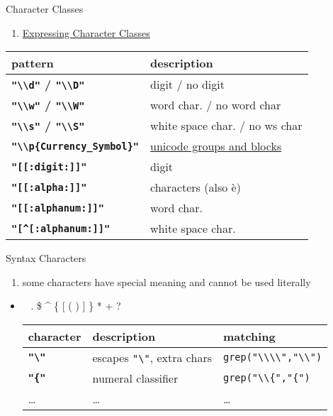 \documentclass[ignorenonframetext,]{beamer}
\providecommand{\tightlist}{%
  \setlength{\itemsep}{0pt}\setlength{\parskip}{0pt}}
\begin{document}
\begin{frame}[fragile]{Character Classes}

\begin{enumerate}
\def\labelenumi{\arabic{enumi})}
\setcounter{enumi}{2}
\tightlist
\item
  \href{http://regexlib.com/CheatSheet.aspx}{Expressing Character
  Classes}
\end{enumerate}

\begin{longtable}[c]{@{}ll@{}}
\toprule
pattern & description\tabularnewline
\midrule
\endhead
\textbf{\texttt{"\textbackslash{}\textbackslash{}d"} /
\texttt{"\textbackslash{}\textbackslash{}D"}} & digit / no
digit\tabularnewline
\textbf{\texttt{"\textbackslash{}\textbackslash{}w"} /
\texttt{"\textbackslash{}\textbackslash{}W"}} & word char. / no word
char\tabularnewline
\textbf{\texttt{"\textbackslash{}\textbackslash{}s"} /
\texttt{"\textbackslash{}\textbackslash{}S"}} & white space char. / no
ws char\tabularnewline
\textbf{\texttt{"\textbackslash{}\textbackslash{}p\{Currency\_Symbol\}"}}
& \href{http://www.regular-expressions.info/unicode.html}{unicode groups
and blocks}\tabularnewline
\textbf{\texttt{"{[}{[}:digit:{]}{]}"}} & digit\tabularnewline
\textbf{\texttt{"{[}{[}:alpha:{]}{]}"}} & characters (also
è)\tabularnewline
\textbf{\texttt{"{[}{[}:alphanum:{]}{]}"}} & word char.\tabularnewline
\textbf{\texttt{"{[}\^{}{[}:alphanum:{]}{]}"}} & white space
char.\tabularnewline
\bottomrule
\end{longtable}

\end{frame}

\begin{frame}[fragile]{Syntax Characters}

\begin{enumerate}
\def\labelenumi{\arabic{enumi})}
\setcounter{enumi}{3}
\tightlist
\item
  some characters have special meaning and cannot be used literally
\end{enumerate}

\begin{itemize}
\item
  ~ . \$ \^{} \{ {[} ( \textbar{} ) {]} \} * + ?

  \begin{longtable}[c]{@{}lll@{}}
  \toprule
  character & description & matching\tabularnewline
  \midrule
  \endhead
  \textbf{\texttt{"\textbackslash{}"}} & escapes
  \texttt{"\textbackslash{}"}, extra chars &
  \texttt{grep("\textbackslash{}\textbackslash{}\textbackslash{}\textbackslash{}","\textbackslash{}\textbackslash{}")}\tabularnewline
  \textbf{\texttt{"\{"}} & numeral classifier &
  \texttt{grep("\textbackslash{}\textbackslash{}\{","\{")}\tabularnewline
  \ldots{} & \ldots{} & \ldots{}\tabularnewline
  \bottomrule
  \end{longtable}
\end{itemize}

\end{frame}
\end{document}
